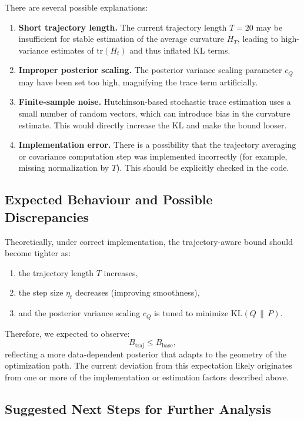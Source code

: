 There are several possible explanations:

\begin{enumerate}
    \item \textbf{Short trajectory length.} The current trajectory length $T = 20$ may be insufficient for stable estimation of the average curvature $\overline{H}_T$, leading to high-variance estimates of $\mathrm{tr}(H_t)$ and thus inflated KL terms.
    \item \textbf{Improper posterior scaling.} The posterior variance scaling parameter $c_Q$ may have been set too high, magnifying the trace term artificially.
    \item \textbf{Finite-sample noise.} Hutchinson-based stochastic trace estimation uses a small number of random vectors, which can introduce bias in the curvature estimate. This would directly increase the KL and make the bound looser.
    \item \textbf{Implementation error.} There is a possibility that the trajectory averaging or covariance computation step was implemented incorrectly (for example, missing normalization by $T$). This should be explicitly checked in the code.
\end{enumerate}

\subsection{Expected Behaviour and Possible Discrepancies}

Theoretically, under correct implementation, the trajectory-aware bound should become tighter as:
\begin{enumerate}
    \item the trajectory length $T$ increases,
    \item the step size $\eta_t$ decreases (improving smoothness),
    \item and the posterior variance scaling $c_Q$ is tuned to minimize $\mathrm{KL}(Q\,\|\,P)$.
\end{enumerate}

Therefore, we expected to observe:
\[
B_{\text{traj}} \le B_{\text{base}},
\]
reflecting a more data-dependent posterior that adapts to the geometry of the optimization path. The current deviation from this expectation likely originates from one or more of the implementation or estimation factors described above.

\subsection{Suggested Next Steps for Further Analysis}


